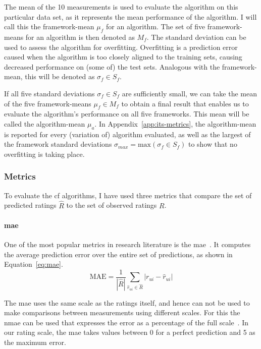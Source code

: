 The mean of the 10 measurements is used to evaluate the algorithm on this particular data set, as it represents the mean performance of the algorithm.
I will call this the framework-mean $\mu_f$ for an algorithm.
The set of five framework-means for an algorithm is then denoted as $M_f$.
The standard deviation can be used to assess the algorithm for overfitting.
Overfitting is a prediction error caused when the algorithm is too closely aligned to the training sets, causing decreased performance on (some of) the test sets.
Analogous with the framework-mean, this will be denoted as $\sigma_f \in S_f$.

If all five standard deviations $\sigma_f \in S_f$ are sufficiently small, we can take the mean of the five framework-means $\mu_f \in M_f$ to obtain a final result that enables us to evaluate the algorithm's performance on all five frameworks.
This mean will be called the algorithm-mean $\mu_{a}$.
In Appendix~\ref{app:its-metrics}, the algorithm-mean is reported for every (variation of) algorithm evaluated, as well as the largest of the framework standard deviations $\sigma_{max} = \text{max}(\sigma_f \in S_f)$ to show that no overfitting is taking place.

\subsubsection{Metrics}
To evaluate the \gls{cf} algorithms, I have used three metrics that compare the set of predicted ratings $\hat{R}$ to the set of observed ratings $R$.

\paragraph{\gls{mae}}
One of the most popular metrics in research literature is the \gls{mae}~\cite{sarwar2001item,su2009survey}.
It computes the average prediction error over the entire set of predictions, as shown in Equation~\ref{eq:mae}.
\begin{equation}
    \label{eq:mae}
    \text{MAE} = \frac{1}{ |\hat{R}| }  \sum\limits_{\hat{r}_{ui} \in \hat{R}} |r_{ui} - \hat{r}_{ui}|
\end{equation}

The \gls{mae} uses the same scale as the ratings itself, and hence can not be used to make comparisons between measurements using different scales.
For this the \gls{nmae} can be used that expresses the error as a percentage of the full scale~\cite{su2009survey}.
In our rating scale, the \gls{mae} takes values between 0 for a perfect prediction and 5 as the maximum error.

